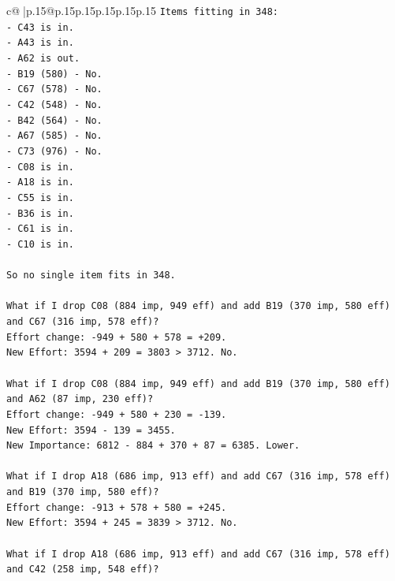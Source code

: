 \documentclass{article}
\begin{document}
{\begin{supertabular}{c@{$\;$}|p{.15\linewidth}@{}p{.15\linewidth}p{.15\linewidth}p{.15\linewidth}p{.15\linewidth}p{.15\linewidth}}
{{{\texttt{Items fitting in 348:} \\
\texttt{{-} C43 is in.} \\
\texttt{{-} A43 is in.} \\
\texttt{{-} A62 is out.} \\
\texttt{{-} B19 (580) {-} No.} \\
\texttt{{-} C67 (578) {-} No.} \\
\texttt{{-} C42 (548) {-} No.} \\
\texttt{{-} B42 (564) {-} No.} \\
\texttt{{-} A67 (585) {-} No.} \\
\texttt{{-} C73 (976) {-} No.} \\
\texttt{{-} C08 is in.} \\
\texttt{{-} A18 is in.} \\
\texttt{{-} C55 is in.} \\
\texttt{{-} B36 is in.} \\
\texttt{{-} C61 is in.} \\
\texttt{{-} C10 is in.} \\
\\ 
\texttt{So no single item fits in 348.} \\
\\ 
\texttt{What if I drop C08 (884 imp, 949 eff) and add B19 (370 imp, 580 eff) and C67 (316 imp, 578 eff)?} \\
\texttt{Effort change: {-}949 + 580 + 578 = +209.} \\
\texttt{New Effort: 3594 + 209 = 3803 > 3712. No.} \\
\\ 
\texttt{What if I drop C08 (884 imp, 949 eff) and add B19 (370 imp, 580 eff) and A62 (87 imp, 230 eff)?} \\
\texttt{Effort change: {-}949 + 580 + 230 = {-}139.} \\
\texttt{New Effort: 3594 {-} 139 = 3455.} \\
\texttt{New Importance: 6812 {-} 884 + 370 + 87 = 6385. Lower.} \\
\\ 
\texttt{What if I drop A18 (686 imp, 913 eff) and add C67 (316 imp, 578 eff) and B19 (370 imp, 580 eff)?} \\
\texttt{Effort change: {-}913 + 578 + 580 = +245.} \\
\texttt{New Effort: 3594 + 245 = 3839 > 3712. No.} \\
\\ 
\texttt{What if I drop A18 (686 imp, 913 eff) and add C67 (316 imp, 578 eff) and C42 (258 imp, 548 eff)?} \\
}}}
\end{supertabular}}
\end{document}
